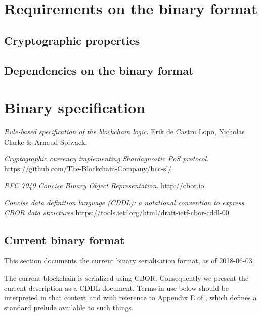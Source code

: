 \documentclass{article}
\begin{document}
\section{Requirements on the binary format}
\label{sec:reqs}

\subsection{Cryptographic properties}

\subsection{Dependencies on the binary format}

\section{Binary specification}
\label{sec:binfmt}

\begin{thebibliography}{9}
  \textit{Rule-based specification of the blockchain logic}.
  Erik de Castro Lopo, Nicholas Clarke \& Arnaud Spiwack.

  \textit{Cryptographic currency implementing Shardagnostic PoS protocol}.
  \url{https://github.com/The-Blockchain-Company/bcc-sl/}

  \textit{RFC 7049 Concise Binary Object Representation}.
  \url{http://cbor.io}

  \textit{Concise data definition language (CDDL): a notational
    convention to express CBOR data structures}
  \url{https://tools.ietf.org/html/draft-ietf-cbor-cddl-00}

\end{thebibliography}

\begin{appendices}
  \section{Current binary format}
  \label{sec:currentfmt}

  This section documents the current binary serialisation format, as of
  2018-06-03.

  The current blockchain is serialized using CBOR\cite{cbor}. Consequently we
  present the current description as a CDDL\cite{cddl} document. Terms in use
  below should be interpreted in that context and with reference to Appendix E
  of \cite{cddl}, which defines a standard prelude available to such things.

  

\end{appendices}
\end{document}
